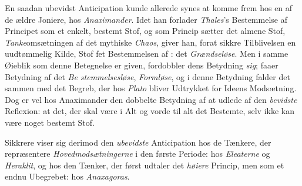 En saadan ubevidst Anticipation kunde allerede synes at
komme frem hos en af de ældre Joniere, hos \emph{Anaximander}.
Idet han forlader \emph{Thales}'s Bestemmelse af Principet som et
enkelt, bestemt Stof, og som Princip sætter det almene
Stof, \emph{Tanke}omsætningen af det mythiske \emph{Chaos}, giver
han, forat sikkre Tilblivelsen en uudtømmelig Kilde, Stof\-%
fet Bestemmelsen af : det \emph{Grændseløse}. Men
 i samme Øieblik som denne Betegnelse er given, fordobbler
dens Betydning \emph{sig};  faaer Betydning af det \emph{Be\-%
stemmelsesløse}, \emph{Formløse}, og i denne Betydning falder
det sammen med det Begreb, der hos \emph{Plato} bliver Udtrykket
for Ideens Modsætning. Dog er vel hos Anaximander den
dobbelte Betydning af  at udlede af den \emph{bevidste}
Reflexion: at det, der skal være i Alt og vorde til alt det
Bestemte, selv ikke kan være noget bestemt Stof.

Sikkrere viser sig derimod den \emph{ubevidste} Anticipation
hos de Tænkere, der repræsentere \emph{Hovedmodsætningerne}
i den første Periode: hos \emph{Eleaterne} og \emph{Heraklit}, og hos
den Tænker, der først udtaler det \emph{høiere} Princip, men som
et endnu Ubegrebet: hos \emph{Anaxagoras}.

